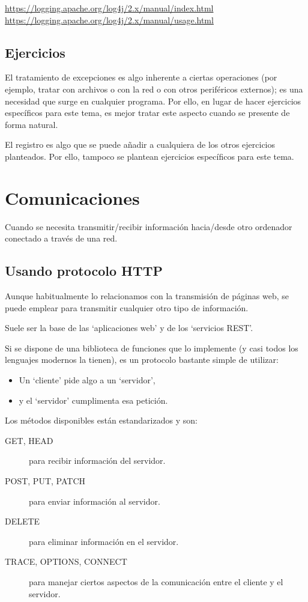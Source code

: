 \documentclass[spanish,12pt,a4paper,final,oneside]{book}
\begin{document}
\url{https://logging.apache.org/log4j/2.x/manual/index.html}
\\\url{https://logging.apache.org/log4j/2.x/manual/usage.html}

\section{Ejercicios}
El tratamiento de excepciones es algo inherente a ciertas operaciones (por ejemplo, tratar con archivos o con la red o con otros periféricos externos); es una necesidad que surge en cualquier programa. Por ello, en lugar de hacer ejercicios específicos para este tema, es mejor tratar este aspecto cuando se presente de forma natural.

El registro es algo que se puede añadir a cualquiera de los otros ejercicios planteados. Por ello, tampoco se plantean ejercicios específicos para este tema.


\chapter{Comunicaciones}
Cuando se necesita transmitir/recibir información hacia/desde otro ordenador conectado a través de una red.

\section{Usando protocolo HTTP}
Aunque habitualmente lo relacionamos con la transmisión de páginas web, se puede emplear para transmitir cualquier otro tipo de información.

Suele ser la base de las `aplicaciones web' y de los `servicios REST'.

Si se dispone de una biblioteca de funciones que lo implemente (y casi todos los lenguajes modernos la tienen), es un protocolo bastante simple de utilizar:
\begin{itemize}
\item Un `cliente' pide algo a un `servidor', 
\item y el `servidor' cumplimenta esa petición.
\end{itemize}

Los métodos disponibles están estandarizados y son:
\begin{description}
\item[GET, HEAD] para recibir información del servidor.
\item[POST, PUT, PATCH] para enviar información al servidor.
\item[DELETE] para eliminar información en el servidor.
\item[TRACE, OPTIONS, CONNECT] para manejar ciertos aspectos de la comunicación entre el cliente y el servidor.
\end{description}
\end{document}
